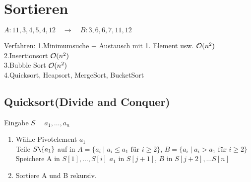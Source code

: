 %
%

\chapter{Sortieren}
    $A: 11,3,4,5,4,12 \quad \rightarrow \quad B:3,6,6,7,11,12$\\
    \begin{tabbing}
        Verfahren: \= 1.Minimumsuche + Austausch mit 1. Element usw. $\mathcal{O}(n^{2})$\\
        \> 2.Insertionsort $\mathcal{O}(n^{2})$\\
        \> 3.Bubble Sort $\mathcal{O}(n^{2})$\\
        \> 4.Quicksort, Heapsort, MergeSort, BucketSort
    \end{tabbing}
        

    \section{Quicksort(Divide and Conquer)}
        Eingabe $S$ \ \ $a_1, \ldots , a_n$
        \begin{enumerate}
           \item Wähle Pivotelement $a_1$ \\
           Teile $S \verb=\= \{ a_1 \}$ auf in $A= \{a_i \mid a_i \leq a_1 \text{ für } i \geq 2 \}$, 
           	$B = \{a_i \mid a_i > a_1 \text{ für } i \geq 2 \}$ \\
           Speichere A in $S[1], \ldots, S[i]$ $a_1$ in $S[j+1]$, $B$ in $ S[j+2], \ldots S[n]$ 
           \item Sortiere A und B rekursiv. 
        \end{enumerate}

